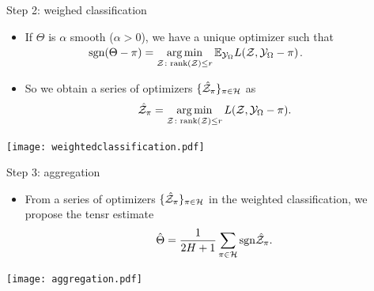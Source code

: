 \documentclass[10pt, mathserif]{beamer} %
\theoremstyle{definition}
\theoremstyle{plain}
\begin{document}
\begin{frame}{Step 2: weighed classification}
   \begin{itemize}
    \item If $\Theta$ is $\alpha$ smooth ($\alpha>0$), we have {\color{red}a unique optimizer}  such that\\[.1cm]
       $\hspace{2cm}\text{sgn}(\Theta-\pi) = \operatorname*{arg\,min}\limits_{\mathcal{Z}\colon \text{rank}(\mathcal{Z})\leq r} \mathbb{E}_{\mathcal{Y}_\Omega}L(\mathcal{Z},\mathcal{Y}_\Omega-\pi)$.\vspace*{.1cm}

    \item So we obtain a series of optimizers $\{\hat {\mathcal{Z}}_\pi\}_{\pi\in\mathcal{H}}$ as
    \begin{align}
        \hat {\mathcal{Z}}_\pi = \operatorname*{arg\,min}_{\mathcal{Z}\colon \text{rank}(\mathcal{Z})\leq r}L(\mathcal{Z},\mathcal{Y}_\Omega-\pi).
    \end{align}
    \end{itemize}
     \begin{center}
 \texttt{[image: weightedclassification.pdf]}
 \end{center}
\end{frame}

\begin{frame}{Step 3: aggregation}
    \begin{itemize}
    \item From a series of optimizers $\{\hat{\mathcal{Z}}_\pi\}_{\pi\in\mathcal{H}}$ in the weighted classification, we propose the tensr estimate 
    \begin{align}
        \hat\Theta = {1\over 2H+1}\sum_{\pi\in\mathcal{H}}\text{sgn}\hat {\mathcal{Z}}_\pi.
    \end{align}
    \end{itemize}
     \begin{center}
    \texttt{[image: aggregation.pdf]}
    \end{center}
\end{frame}
\end{document}
